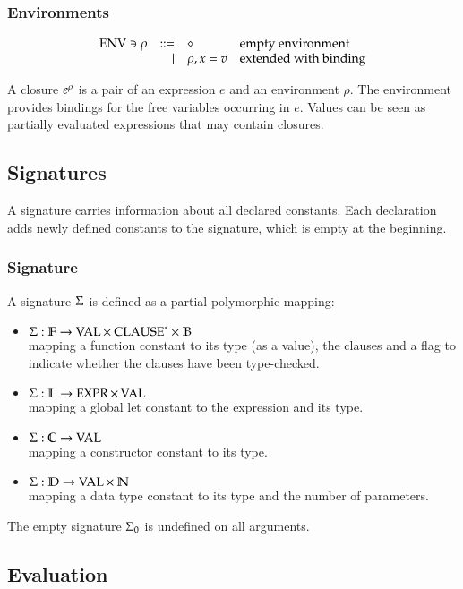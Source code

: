\subsubsection{Environments}
\[
\begin{array}{lrll}
\operatorname{ENV} \ni \rho & ::= & \diamond & \mbox{empty environment}\\
& \mid & \rho,x = v & \mbox{extended with binding}\\
\end{array}
\]

A closure $e^{\rho}$ is a pair of an expression $e$ and an environment $\rho$.
The environment provides bindings for the free variables occurring in $e$.
Values can be seen as partially evaluated expressions that may contain closures.

\subsection{Signatures}

A signature carries information about all declared constants.
Each declaration adds newly defined constants to the signature, which is empty at the beginning.
\subsubsection{Signature}
A signature $\Sigma$ is defined as a partial polymorphic mapping:
\begin{itemize}
\item
$ \Sigma : \mathbb{F} \rightarrow \operatorname{VAL} \times \: {\operatorname{CLAUSE}}^{\ast} \times \mathbb{B} $\\
mapping a function constant to its type (as a value), the clauses and a flag to indicate whether the clauses have been type-checked.
\item
$ \Sigma : \mathbb{L} \rightarrow \operatorname{EXPR} \times \operatorname{VAL} $\\
mapping a global let constant to the expression and its type. 
\item
$ \Sigma : \mathbb{C} \rightarrow \operatorname{VAL} $\\
mapping a constructor constant to its type.
\item
$ \Sigma : \mathbb{D} \rightarrow \operatorname{VAL} \times \: \mathbb{N} $\\
mapping a data type constant to its type and the number of parameters.
\end{itemize}

\noindent The empty signature $\Sigma_0$ is undefined on all arguments.



\subsection{Evaluation}

